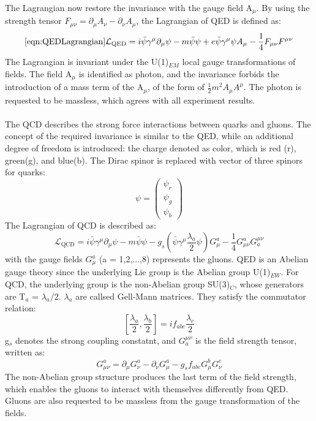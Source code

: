 The Lagrangian now restore the invariance with the gauge field A$_\mu$. By using the strength tensor $F_{\mu \nu}=\partial_{\mu} A_{\nu}-\partial_{\nu} A_{\mu}$, the Lagrangian of QED is defined as:
\begin{equation}
\ref{eqn:QEDLagrangian}
\mathcal{L}_{\mathrm{QED}}=i \bar{\psi} \gamma^{\mu} \partial_{\mu} \psi-m \bar{\psi} \psi+e \bar{\psi} \gamma^{\mu} \psi A_{\mu}-\frac{1}{4} F_{\mu \nu} F^{\mu \nu}
\end{equation}
The Lagrangian is invariant under the U(1)$_{EM}$ local gauge transformations of fields. The field A$_\mu$ is identified as photon, and the invariance forbids the introduction of a mass term of the A$_\mu$, of the form of $\frac{1}{2}m^2 A_\mu A^\mu$. The photon is requested to be massless, which agrees with all experiment results.
\\

\noindent\textbf{} \\ 
The QCD describes the strong force interactions between quarks and gluons. The concept of the required invariance is similar to the QED, while an additional degree of freedom is introduced: the charge denoted as color, which is red (r), green(g), and blue(b). The Dirac spinor is replaced with vector of three spinors for quarks:
\begin{equation}
\psi=\left(\begin{array}{c}
\psi_{r} \\
\psi_{g} \\
\psi_{b}
\end{array}\right)
\end{equation}
The Lagrangian of QCD is described as:
\begin{equation}
\mathcal{L}_{\mathrm{QCD}}=i \bar{\psi} \gamma^{\mu} \partial_{\mu} \psi-m \bar{\psi} \psi-g_{s}\left(\bar{\psi} \gamma^{\mu} \frac{\lambda_{a}}{2} \psi\right) G_{\mu}^{a}-\frac{1}{4} G_{\mu \nu}^{a} G_{a}^{\mu \nu}
\end{equation}
with the gauge fields $G_{\mu}^{a}$ (a = 1,2,...,8) represents the gluons.
QED is an Abelian gauge theory since the underlying Lie group is the Abelian group U(1)$_{EW}$. For QCD, the underlying group is the non-Abelian group SU(3)$_C$, whose generators are T$_a$ = $\lambda_{a}/2$. $\lambda_{a}$ are callsed Gell-Mann matrices. They satisfy the commutator relation:
\begin{equation}
\left[\frac{\lambda_{a}}{2}, \frac{\lambda_{b}}{2}\right]=i f_{a b c} \frac{\lambda_{c}}{2}
\end{equation}
g$_s$ denotes the strong coupling constatnt, and $G_{a}^{\mu \nu}$ is the field strength tensor, written as:
\begin{equation}
G_{\mu \nu}^{a}=\partial_{\mu} G_{\nu}^{a}-\partial_{\nu} G_{\mu}^{a}-g_{s} f_{a b c} G_{\mu}^{b} G_{\nu}^{c}
\end{equation}
The non-Abelian group structure produces the last term of the field strength, which enables the gluons to interact with themselves differently from QED. Gluons are also requested to be massless from the gauge transformation of the fields.
\\ \\

